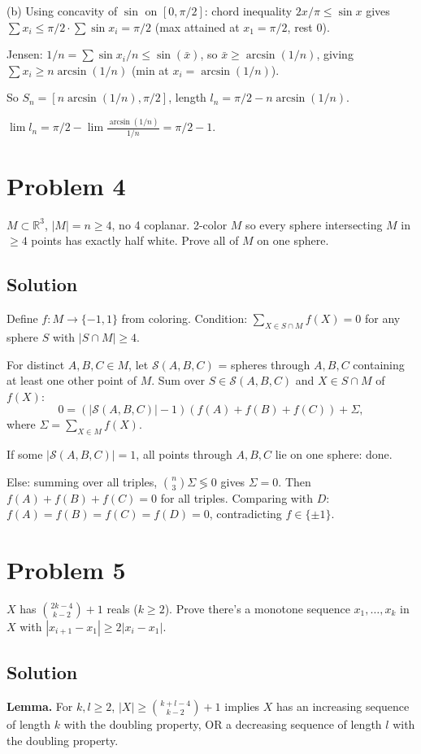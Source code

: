 \documentclass{article}
\begin{document}
(b) Using concavity of $\sin$ on $[0, \pi/2]$: chord inequality $2x/\pi \le \sin x$ gives $\sum x_i \le \pi/2 \cdot \sum \sin x_i = \pi/2$ (max attained at $x_1 = \pi/2$, rest $0$).

Jensen: $1/n = \sum \sin x_i / n \le \sin(\bar x)$, so $\bar x \ge \arcsin(1/n)$, giving $\sum x_i \ge n \arcsin(1/n)$ (min at $x_i = \arcsin(1/n)$).

So $S_n = [n \arcsin(1/n), \pi/2]$, length $l_n = \pi/2 - n \arcsin(1/n)$.

$\lim l_n = \pi/2 - \lim \frac{\arcsin(1/n)}{1/n} = \pi/2 - 1$.

\section*{Problem 4}
$M \subset \mathbb{R}^3$, $|M| = n \ge 4$, no 4 coplanar. 2-color $M$ so every sphere intersecting $M$ in $\ge 4$ points has exactly half white. Prove all of $M$ on one sphere.

\subsection*{Solution}
Define $f : M \to \{-1, 1\}$ from coloring. Condition: $\sum_{X \in S \cap M} f(X) = 0$ for any sphere $S$ with $|S \cap M| \ge 4$.

For distinct $A, B, C \in M$, let $\mathcal S(A, B, C)$ = spheres through $A, B, C$ containing at least one other point of $M$. Sum over $S \in \mathcal S(A, B, C)$ and $X \in S \cap M$ of $f(X)$:
\[
0 = (|\mathcal S(A,B,C)| - 1)(f(A) + f(B) + f(C)) + \Sigma,
\]
where $\Sigma = \sum_{X \in M} f(X)$.

If some $|\mathcal S(A,B,C)| = 1$, all points through $A, B, C$ lie on one sphere: done.

Else: summing over all triples, $\binom{n}{3} \Sigma \lessgtr 0$ gives $\Sigma = 0$. Then $f(A) + f(B) + f(C) = 0$ for all triples. Comparing with $D$: $f(A) = f(B) = f(C) = f(D) = 0$, contradicting $f \in \{\pm 1\}$.

\section*{Problem 5}
$X$ has $\binom{2k-4}{k-2} + 1$ reals ($k \ge 2$). Prove there's a monotone sequence $x_1, \ldots, x_k$ in $X$ with $|x_{i+1} - x_1| \ge 2 |x_i - x_1|$.

\subsection*{Solution}
\textbf{Lemma.} For $k, l \ge 2$, $|X| \ge \binom{k+l-4}{k-2} + 1$ implies $X$ has an increasing sequence of length $k$ with the doubling property, OR a decreasing sequence of length $l$ with the doubling property.
\end{document}
